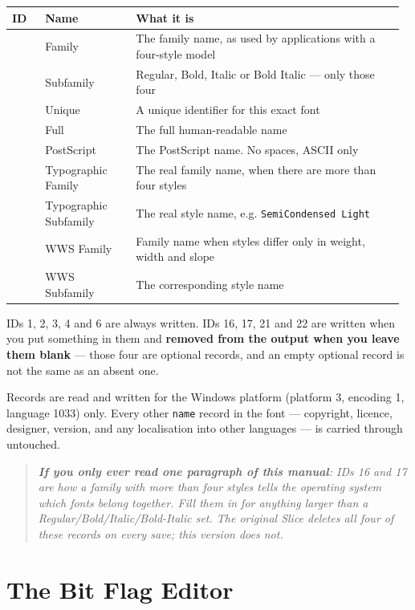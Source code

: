 \documentclass[11pt,a4paper]{article}
\newenvironment{callout}%
  {\begin{quote}\itshape\small}%
  {\end{quote}}
\begin{document}
\begin{longtable}{>{\RaggedRight\arraybackslash}p{0.0842154811715481\linewidth}>{\RaggedRight\arraybackslash}p{0.22964783821478382\linewidth}>{\RaggedRight\arraybackslash}p{0.6561366806136679\linewidth}}
\toprule
\textbf{ID} & \textbf{Name} & \textbf{What it is} \\
\midrule\endhead
1 & Family & The family name, as used by applications with a four-style model \\
2 & Subfamily & Regular, Bold, Italic or Bold Italic --- only those four \\
3 & Unique & A unique identifier for this exact font \\
4 & Full & The full human-readable name \\
6 & PostScript & The PostScript name. No spaces, ASCII only \\
16 & Typographic Family & The real family name, when there are more than four styles \\
17 & Typographic Subfamily & The real style name, e.g. \texttt{SemiCondensed Light} \\
21 & WWS Family & Family name when styles differ only in weight, width and slope \\
22 & WWS Subfamily & The corresponding style name \\
\bottomrule
\end{longtable}

IDs 1, 2, 3, 4 and 6 are always written. IDs 16, 17, 21 and 22 are written when you put something in them and \textbf{removed from the output when you leave them blank} --- those four are optional records, and an empty optional record is not the same as an absent one.

Records are read and written for the Windows platform (platform 3, encoding 1, language 1033) only. Every other \texttt{name} record in the font --- copyright, licence, designer, version, and any localisation into other languages --- is carried through untouched.

\begin{callout}
\textbf{If you only ever read one paragraph of this manual}: IDs 16 and 17 are how a family with more than four styles tells the operating system which fonts belong together. Fill them in for anything larger than a Regular/Bold/Italic/Bold-Italic set. The original Slice deletes all four of these records on every save; this version does not.
\end{callout}

\section{The Bit Flag Editor}
\end{document}
